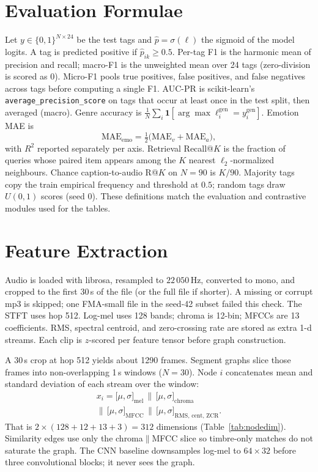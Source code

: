 \documentclass[conference]{IEEEtran}
\begin{document}
\section{Evaluation Formulae}
Let $y\in\{0,1\}^{N\times 24}$ be the test tags and $\hat p=\sigma(\ell)$ the sigmoid of the model logits. A tag is predicted positive if $\hat p_{ik}\ge 0.5$. Per-tag F1 is the harmonic mean of precision and recall; macro-F1 is the unweighted mean over 24 tags (zero-division is scored as 0). Micro-F1 pools true positives, false positives, and false negatives across tags before computing a single F1. AUC-PR is scikit-learn's \texttt{average\_precision\_score} on tags that occur at least once in the test split, then averaged (macro). Genre accuracy is $\frac1N\sum_i\mathbf{1}[\arg\max \ell_i^{\mathrm{gen}}=y_i^{\mathrm{gen}}]$. Emotion MAE is
\begin{equation}
\mathrm{MAE}_{\mathrm{emo}}=\tfrac12\big(\mathrm{MAE}_v+\mathrm{MAE}_a\big),
\end{equation}
with $R^2$ reported separately per axis. Retrieval Recall@$K$ is the fraction of queries whose paired item appears among the $K$ nearest $\ell_2$-normalized neighbours. Chance caption-to-audio R@$K$ on $N=90$ is $K/90$. Majority tags copy the train empirical frequency and threshold at $0.5$; random tags draw $U(0,1)$ scores (seed 0). These definitions match the evaluation and contrastive modules used for the tables.

\section{Feature Extraction}
Audio is loaded with librosa, resampled to $22\,050$\,Hz, converted to mono, and cropped to the first 30\,s of the file (or the full file if shorter). A missing or corrupt mp3 is skipped; one FMA-small file in the seed-42 subset failed this check. The STFT uses hop 512. Log-mel uses 128 bands; chroma is 12-bin; MFCCs are 13 coefficients. RMS, spectral centroid, and zero-crossing rate are stored as extra 1-d streams. Each clip is $z$-scored per feature tensor before graph construction.

A 30\,s crop at hop 512 yields about 1290 frames. Segment graphs slice those frames into non-overlapping 1\,s windows ($N=30$). Node $i$ concatenates mean and standard deviation of each stream over the window:
\begin{multline}
x_i=\big[\mu,\sigma\big]_{\mathrm{mel}}\,\|\,\big[\mu,\sigma\big]_{\mathrm{chroma}}\\
\|\,\big[\mu,\sigma\big]_{\mathrm{MFCC}}\,\|\,\big[\mu,\sigma\big]_{\mathrm{RMS,\,cent,\,ZCR}}.
\end{multline}
That is $2\times(128+12+13+3)=312$ dimensions (Table~\ref{tab:nodedim}). Similarity edges use only the chroma$\|$MFCC slice so timbre-only matches do not saturate the graph. The CNN baseline downsamples log-mel to $64\times 32$ before three convolutional blocks; it never sees the graph.
\end{document}
